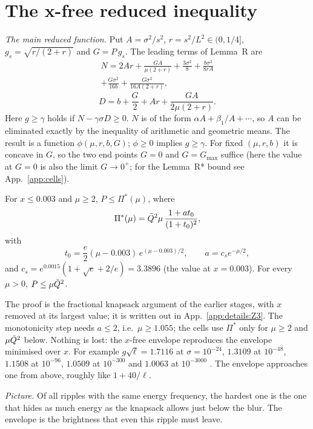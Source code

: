 \section{The x-free reduced inequality}
\label{sec:envelope}

\emph{The main reduced function.}
Put $A=\sigma^2/s^2$, $r=s^2/L^2\in(0,1/4]$, $g_s=\sqrt{r/(2+r)}$ and $G=P\,g_s$.
The leading terms of Lemma~R are
\begin{multline}
N=2Ar+\frac{GA}{\mu(2+r)}+\frac{3\sigma^2}{8}+\frac{b\sigma^2}{8rA}\\
+\frac{G\sigma^2}{16b}+\frac{G\sigma^2}{16A(2+r)},
\end{multline}
\begin{equation}
D=b+\frac{G}{2}+Ar+\frac{GA}{2\mu(2+r)} .
\end{equation}
Here $g\ge\gamma$ holds if $N-\gamma\sigma D\ge0$.
$N$ is of the form $\alpha A+\beta_1/A+\cdots$, so $A$ can be eliminated exactly by the inequality of arithmetic and geometric means.
The result is a function $\phi(\mu,r,b,G)$; $\phi\ge0$ implies $g\ge\gamma$.
For fixed $(\mu,r,b)$ it is concave in $G$, so the two end points $G=0$ and $G=G_{\max}$ suffice (here the value at $G=0$ is also the limit $G\to0^+$; for the Lemma~R* bound see App.~\ref{app:cells}).

\begin{lemma} \proofst
\label{lem:Z3}
For $x\le0.003$ and $\mu\ge2$, $P\le\Pi^*(\mu)$, where
\begin{equation}
\Pi^*(\mu)=\bar Q^2\mu\,\frac{1+at_0}{(1+t_0)^2},
\end{equation}
with
\begin{equation}
t_0=\frac{e}{2}(\mu-0.003)\,e^{(\mu-0.003)/2},\qquad a=c_s e^{-\mu/2},
\end{equation}
and $c_s=e^{0.0015}(1+\sqrt e+2/e)=3.3896$ (the value at $x=0.003$).
For every $\mu>0$, $P\le\mu\bar Q^2$.
\end{lemma}
The proof is the fractional knapsack argument of the earlier stages, with $x$ removed at its largest value; it is written out in App.~\ref{app:details:Z3}.
The monotonicity step needs $a\le2$, i.e.\ $\mu\ge1.055$; the cells use $\Pi^*$ only for $\mu\ge2$ and $\mu\bar Q^2$ below.
Nothing is lost: the $x$-free envelope reproduces the envelope minimised over $x$.
For example $g\sqrt\ell=1.7116$ at $\sigma=10^{-24}$, $1.3109$ at $10^{-48}$, $1.1508$ at $10^{-96}$, $1.0509$ at $10^{-300}$ and $1.0063$ at $10^{-3000}$ \numst.
The envelope approaches one from above, roughly like $1+40/\ell$.

\emph{Picture.} Of all ripples with the same energy frequency, the hardest one is the one that hides as much energy as the knapsack allows just below the blur.
The envelope is the brightness that even this ripple must leave.

